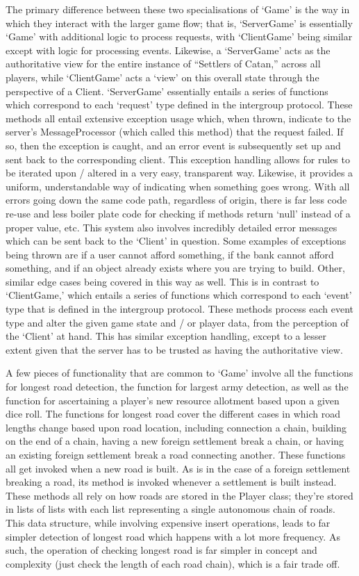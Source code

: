\documentclass[a4paper,doc,draftfirst]{apa6}
\begin{document}
The primary difference between these two specialisations of ‘Game’ is the way in which they interact with the larger game flow; that is, ‘ServerGame’ is essentially ‘Game’ with additional logic to process requests, with ‘ClientGame’ being similar except with logic for processing events. Likewise, a ‘ServerGame’ acts as the authoritative view for the entire instance of “Settlers of Catan,” across all players, while ‘ClientGame’ acts a ‘view’ on this overall state through the perspective of a Client. ‘ServerGame’ essentially entails a series of functions which correspond to each ‘request’ type defined in the intergroup protocol. These methods all entail extensive exception usage which, when thrown, indicate to the server’s MessageProcessor (which called this method) that the request failed. If so, then the exception is caught, and an error event is subsequently set up and sent back to the corresponding client. This exception handling allows for rules to be iterated upon / altered in a very easy, transparent way. Likewise, it provides a uniform, understandable way of indicating when something goes wrong. With all errors going down the same code path, regardless of origin, there is far less code re-use and less boiler plate code for checking if methods return ‘null’ instead of a proper value, etc. This system also involves incredibly detailed error messages which can be sent back to the ‘Client’  in question. Some examples of exceptions being thrown are if a user cannot afford something, if the bank cannot afford something, and if an object already exists where you are trying to build. Other, similar edge cases being covered in this way as well. This is in contrast to ‘ClientGame,’ which entails a series of functions which correspond to each ‘event’ type that is defined in the intergroup protocol. These methods process each event type and alter the given game state and / or player data, from the perception of the ‘Client’ at hand. This has similar exception handling, except to a lesser extent given that the server has to be trusted as having the authoritative view.

A few pieces of functionality that are common to ‘Game’ involve all the functions for longest road detection, the function for largest army detection, as well as the function for ascertaining a player’s new resource allotment based upon a given dice roll. The functions for longest road cover the different cases in which road lengths change based upon road location, including connection a chain, building on the end of a chain, having a new foreign settlement break a chain, or having an existing foreign settlement break a road connecting another. These functions all get invoked when a new road is built. As is in the case of a foreign settlement breaking a road, its method is invoked whenever a settlement is built instead. These methods all rely on how roads are stored in the Player class; they’re stored in lists of lists with each list representing a single autonomous chain of roads. This data structure, while involving expensive insert operations, leads to far simpler detection of longest road which happens with a lot more frequency. As such, the operation of checking longest road is far simpler in concept and complexity (just check the length of each road chain), which is a fair trade off.
\end{document}
